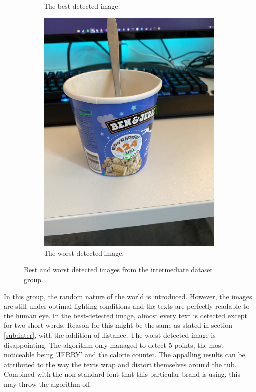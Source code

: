 \documentclass[10pt, a4paper]{article}
\begin{document}
\begin{figure}[h!]
\begin{subfigure}[b]{0.4\linewidth}
		\caption{The best-detected image.}
	\end{subfigure}
	\begin{subfigure}[b]{0.4\linewidth}
		\includegraphics[width=\linewidth]{jupyter/results/inter/sample_output_2.jpeg}
		\caption{The worst-detected image.}
	\end{subfigure}
	\caption{Best and worst detected images from the intermediate dataset group.}
	\label{fig:sampleinterbestworst}
  \end{figure}

In this group, the random nature of the world is introduced. However, the images are still under optimal lighting conditions and the texts are perfectly readable to the human eye.
In the best-detected image, almost every text is detected except for two short words. Reason for this might be the same as stated in section \ref{sub:inter}, with the addition of distance. The worst-detected image is disappointing. The algorithm only managed to detect 5 points, the most noticeable being 'JERRY' and the calorie counter. The appalling results can be attributed to the way the texts wrap and distort themselves around the tub. Combined with the non-standard font that this particular brand is using, this may throw the algorithm off.
\clearpage
\end{document}

